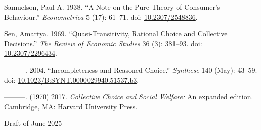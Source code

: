 \documentclass[
  11pt,
  letterpaper,
  DIV=11,
  numbers=noendperiod,
  twoside]{scrartcl}
\newlength{\cslhangindent}
\newenvironment{CSLReferences}[2] %
 {\begin{list}{}{%
  \setlength{\itemindent}{0pt}
  \setlength{\leftmargin}{0pt}
  \setlength{\parsep}{0pt}
  \ifodd #1
   \setlength{\leftmargin}{\cslhangindent}
   \setlength{\itemindent}{-1\cslhangindent}
  \fi
  \setlength{\itemsep}{#2\baselineskip}}}
 {\end{list}}
\begin{document}
\begin{CSLReferences}{1}{0}
Samuelson, Paul A. 1938. {``A Note on the Pure Theory of Consumer's
Behaviour.''} \emph{Econometrica} 5 (17): 61--71. doi:
\href{https://doi.org/10.2307/2548836}{10.2307/2548836}.

Sen, Amartya. 1969. {``Quasi-Transitivity, Rational Choice and
Collective Decisions.''} \emph{The Review of Economic Studies} 36 (3):
381--93. doi: \href{https://doi.org/10.2307/2296434}{10.2307/2296434}.

---------. 2004. {``Incompleteness and Reasoned Choice.''}
\emph{Synthese} 140 (May): 43--59. doi:
\href{https://doi.org/10.1023/B:SYNT.0000029940.51537.b3}{10.1023/B:SYNT.0000029940.51537.b3}.

---------. (1970) 2017. \emph{Collective Choice and Social Welfare:} An
expanded edition. Cambridge, MA: Harvard University Press.

\end{CSLReferences}



\noindent Draft of June 2025
\end{document}

